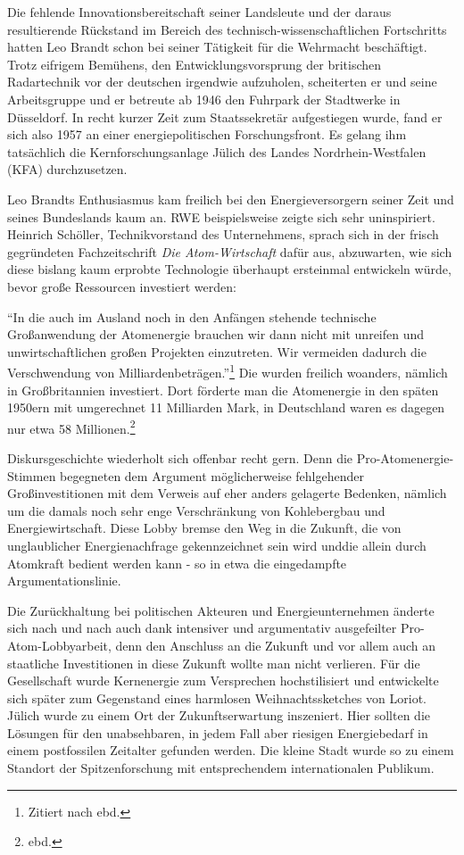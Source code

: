 \documentclass[a4paper,
fontsize=11pt,
oneside,
numbers=noperiodatend,
parskip=half-,
bibliography=totoc,
final
]{scrartcl}
\begin{document}
Die fehlende Innovationsbereitschaft seiner Landsleute und der daraus
resultierende Rückstand im Bereich des technisch-wissenschaftlichen
Fortschritts hatten Leo Brandt schon bei seiner Tätigkeit für die
Wehrmacht beschäftigt. Trotz eifrigem Bemühens, den
Entwicklungsvorsprung der britischen Radartechnik vor der deutschen
irgendwie aufzuholen, scheiterten er und seine Arbeitsgruppe und er
betreute ab 1946 den Fuhrpark der Stadtwerke in Düsseldorf. In recht
kurzer Zeit zum Staatssekretär aufgestiegen wurde, fand er sich also
1957 an einer energiepolitischen Forschungsfront. Es gelang ihm
tatsächlich die Kernforschungsanlage Jülich des Landes
Nordrhein-Westfalen (KFA) durchzusetzen.

Leo Brandts Enthusiasmus kam freilich bei den Energieversorgern seiner
Zeit und seines Bundeslands kaum an. RWE beispielsweise zeigte sich sehr
uninspiriert. Heinrich Schöller, Technikvorstand des Unternehmens,
sprach sich in der frisch gegründeten Fachzeitschrift \emph{Die
Atom-Wirtschaft} dafür aus, abzuwarten, wie sich diese bislang kaum
erprobte Technologie überhaupt ersteinmal entwickeln würde, bevor große
Ressourcen investiert werden:

\enquote{In die auch im Ausland noch in den Anfängen stehende technische
Großanwendung der Atomenergie brauchen wir dann nicht mit unreifen und
unwirtschaftlichen großen Projekten einzutreten. Wir vermeiden dadurch
die Verschwendung von Milliardenbeträgen.}\footnote{Zitiert nach ebd.}
Die wurden freilich woanders, nämlich in Großbritannien investiert. Dort
förderte man die Atomenergie in den späten 1950ern mit umgerechnet 11
Milliarden Mark, in Deutschland waren es dagegen nur etwa 58
Millionen.\footnote{ebd.}

Diskursgeschichte wiederholt sich offenbar recht gern. Denn die
Pro-Atomenergie-Stimmen begegneten dem Argument möglicherweise
fehlgehender Großinvestitionen mit dem Verweis auf eher anders gelagerte
Bedenken, nämlich um die damals noch sehr enge Verschränkung von
Kohlebergbau und Energiewirtschaft. Diese Lobby bremse den Weg in die
Zukunft, die von unglaublicher Energienachfrage gekennzeichnet sein wird
unddie allein durch Atomkraft bedient werden kann - so in etwa die
eingedampfte Argumentationslinie.

Die Zurückhaltung bei politischen Akteuren und Energieunternehmen
änderte sich nach und nach auch dank intensiver und argumentativ
ausgefeilter Pro-Atom-Lobbyarbeit, denn den Anschluss an die Zukunft und
vor allem auch an staatliche Investitionen in diese Zukunft wollte man
nicht verlieren. Für die Gesellschaft wurde Kernenergie zum Versprechen
hochstilisiert und entwickelte sich später zum Gegenstand eines
harmlosen Weihnachtssketches von Loriot. Jülich wurde zu einem Ort der
Zukunftserwartung inszeniert. Hier sollten die Lösungen für den
unabsehbaren, in jedem Fall aber riesigen Energiebedarf in einem
postfossilen Zeitalter gefunden werden. Die kleine Stadt wurde so zu
einem Standort der Spitzenforschung mit entsprechendem internationalen
Publikum.
\end{document}
